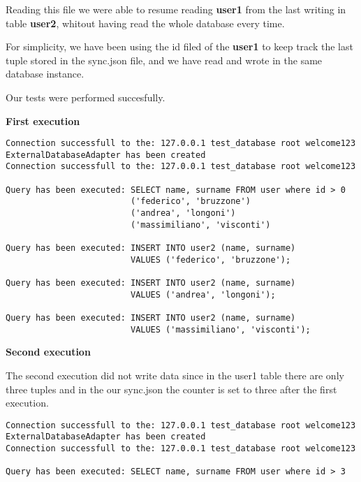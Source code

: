 Reading this file we were able to resume reading \textbf{user1} from the last writing in table \textbf{user2}, whitout having read the whole database every time.

For simplicity, we have been using the id filed of the \textbf{user1} to keep track the last tuple stored in the sync.json file, and we have read and wrote in the same database instance.

Our tests were performed succesfully.


\textbf{First execution}
\begin{lstlisting}
Connection successfull to the: 127.0.0.1 test_database root welcome123 
ExternalDatabaseAdapter has been created
Connection successfull to the: 127.0.0.1 test_database root welcome123 

Query has been executed: SELECT name, surname FROM user where id > 0
                         ('federico', 'bruzzone')
                         ('andrea', 'longoni')
                         ('massimiliano', 'visconti')

Query has been executed: INSERT INTO user2 (name, surname) 
                         VALUES ('federico', 'bruzzone');

Query has been executed: INSERT INTO user2 (name, surname) 
                         VALUES ('andrea', 'longoni');

Query has been executed: INSERT INTO user2 (name, surname) 
                         VALUES ('massimiliano', 'visconti');
\end{lstlisting}


\textbf{Second execution}

The second execution did not write data since in the user1 table there are only three tuples and in the our sync.json the counter is set to three after the first execution.

\begin{lstlisting}
Connection successfull to the: 127.0.0.1 test_database root welcome123 
ExternalDatabaseAdapter has been created
Connection successfull to the: 127.0.0.1 test_database root welcome123 

Query has been executed: SELECT name, surname FROM user where id > 3
\end{lstlisting}
